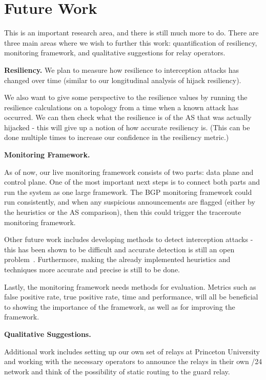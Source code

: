 \section{Future Work}

This is an important research area, and there is still much more to do.  There are three main areas where we wish to further this work: quantification of resiliency, monitoring framework, and qualitative suggestions for relay operators.

{\bf Resiliency.}  
We plan to measure how resilience to interception attacks has changed over time (similar to our longitudinal analysis of hijack resiliency).

We also want to give some perspective to the resilience values by running the resilience calculations on a topology from a time when a known attack has occurred.  We can then check what the resilience is of the AS that was actually hijacked - this will give up a notion of how accurate resiliency is.  (This can be done multiple times to increase our confidence in the resiliency metric.)

{\bf Monitoring Framework.}  

As of now, our live monitoring framework consists of two parts: data plane and control plane.  One of the most important next steps is to connect both parts and run the system as one large framework.  The BGP monitoring framework could run consistently, and when any suspicious announcements are flagged (either by the heuristics or the AS comparison), then this could trigger the traceroute monitoring framework.  

Other future work includes developing methods to detect interception attacks - this has been shown to be difficult and accurate detection is still an open problem~\cite{ballani2007study}.  Furthermore, making the already implemented heuristics and techniques more accurate and precise is still to be done.  

Lastly, the monitoring framework needs methods for evaluation.  Metrics such as false positive rate, true positive rate, time and performance, will all be beneficial to showing the importance of the framework, as well as for improving the framework.  

{\bf Qualitative Suggestions.}

Additional work includes setting up our own set of relays at Princeton University and working with the necessary operators to announce the relays in their own /24 network and think of the possibility of static routing to the guard relay.

